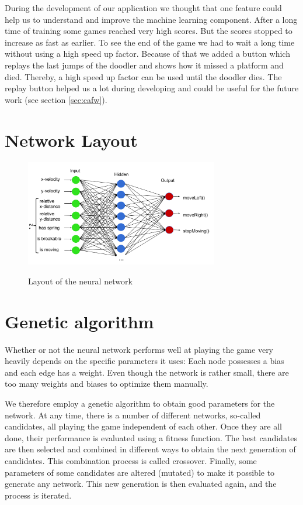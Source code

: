 \documentclass[a4paper,12pt,pagesize,headsepline,bibtotoc,titlepage,abstracton]{scrartcl}
\begin{document}
During the development of our application we thought that one feature could help us to understand and improve the machine learning component. After a long time of training some games reached very high scores. But the scores stopped to increase as fast as earlier. To see the end of the game we had to wait a long time without using a high speed up factor. Because of that we added a button which replays the last jumps of the doodler and shows how it missed a platform and died. Thereby, a high speed up factor can be used until the doodler dies. The replay button helped us a lot during developing and could be useful for the future work (see section \ref{sec:cafw}).

\section{Network Layout}

\begin{figure}[h]
\begin{center}
\includegraphics*[width=0.75\textwidth]{images/network_layout}\\
\caption{Layout of the neural network}
\label{abb:nl}
\end{center}
\end{figure}

\section{Genetic algorithm}
\label{sec:ga}

Whether or not the neural network performs well at playing the game very heavily depends on the specific parameters it uses: Each node possesses a bias and each edge has a weight. Even though the network is rather small, there are too many weights and biases to optimize them manually. 

We therefore employ a genetic algorithm to obtain good parameters for the network. At any time, there is a number of different networks, so-called candidates, all playing the game independent of each other. Once they are all done, their performance is evaluated using a fitness function. The best candidates are then selected and combined in different ways to obtain the next generation of candidates. This combination process is called crossover. Finally, some parameters of some candidates are altered (mutated) to make it possible to generate any network. This new generation is then evaluated again, and the process is iterated.
\end{document}
